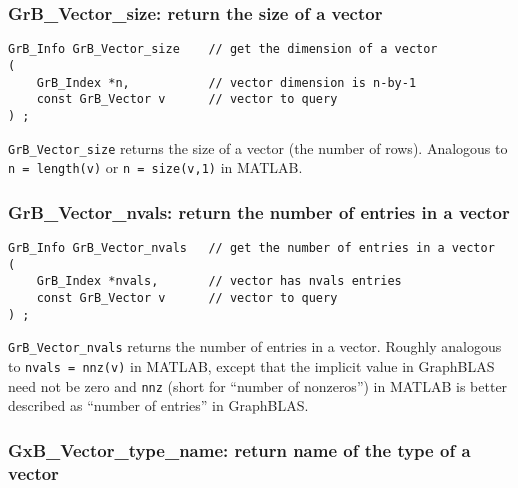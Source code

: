 \documentclass[12pt]{article}
\begin{document}
\subsubsection{{\sf GrB\_Vector\_size:}          return the size of a vector}
\label{vector_size}

\begin{mdframed}[userdefinedwidth=6in]
{\footnotesize
\begin{verbatim}
GrB_Info GrB_Vector_size    // get the dimension of a vector
(
    GrB_Index *n,           // vector dimension is n-by-1
    const GrB_Vector v      // vector to query
) ;
\end{verbatim}
} \end{mdframed}

\verb'GrB_Vector_size' returns the size of a vector (the number of rows).
Analogous to \verb'n = length(v)' or \verb'n = size(v,1)' in MATLAB.

\newpage
\subsubsection{{\sf GrB\_Vector\_nvals:}         return the number of entries in a vector}
\label{vector_nvals}

\begin{mdframed}[userdefinedwidth=6in]
{\footnotesize
\begin{verbatim}
GrB_Info GrB_Vector_nvals   // get the number of entries in a vector
(
    GrB_Index *nvals,       // vector has nvals entries
    const GrB_Vector v      // vector to query
) ;
\end{verbatim}
} \end{mdframed}

\verb'GrB_Vector_nvals' returns the number of entries in a vector.  Roughly
analogous to \verb'nvals = nnz(v)' in MATLAB, except that the implicit value in
GraphBLAS need not be zero and \verb'nnz' (short for ``number of nonzeros'') in
MATLAB is better described as ``number of entries'' in GraphBLAS.

\subsubsection{{\sf GxB\_Vector\_type\_name:} return name of the type of a vector}
\label{vector_type_name}
\end{document}

